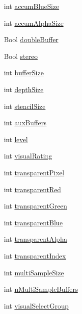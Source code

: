 \begin{DoxyCompactItemize}
\item 
int \hyperlink{struct_____g_l_xvisual_config_rec_a5dd068b5f37bd4b896e9161629acdefd}{accum\+Blue\+Size}
\item 
int \hyperlink{struct_____g_l_xvisual_config_rec_a1f749556f17905b5da92f614983aa5a0}{accum\+Alpha\+Size}
\item 
Bool \hyperlink{struct_____g_l_xvisual_config_rec_a42165fe712f34c8214aa71d5953958be}{double\+Buffer}
\item 
Bool \hyperlink{struct_____g_l_xvisual_config_rec_a5d1f123be522252a20141eb70e79d99e}{stereo}
\item 
int \hyperlink{struct_____g_l_xvisual_config_rec_a4af9a928e1cbb5a2765cae6e5fb545c3}{buffer\+Size}
\item 
int \hyperlink{struct_____g_l_xvisual_config_rec_ab260d7f130a83141e54bc8aa5abc1d9c}{depth\+Size}
\item 
int \hyperlink{struct_____g_l_xvisual_config_rec_a899f4dafc70cb0c9e59ea4461a13a32b}{stencil\+Size}
\item 
int \hyperlink{struct_____g_l_xvisual_config_rec_a7bd75ba88426185827a45f23fe209d67}{aux\+Buffers}
\item 
int \hyperlink{struct_____g_l_xvisual_config_rec_a72475ca5333f2ac05c2d8df045564d8b}{level}
\item 
int \hyperlink{struct_____g_l_xvisual_config_rec_a6ed508db4d8617eabe3308dca055a611}{visual\+Rating}
\item 
int \hyperlink{struct_____g_l_xvisual_config_rec_a67ab90fb429cf9b656a9c9e8039e7d08}{transparent\+Pixel}
\item 
int \hyperlink{struct_____g_l_xvisual_config_rec_a6d9e906e8a1ebf9e06752da26d77cd96}{transparent\+Red}
\item 
int \hyperlink{struct_____g_l_xvisual_config_rec_ab42ad638599dc0aa58a7970402594015}{transparent\+Green}
\item 
int \hyperlink{struct_____g_l_xvisual_config_rec_addf33095e6a7972ec6a936fc5f471589}{transparent\+Blue}
\item 
int \hyperlink{struct_____g_l_xvisual_config_rec_a7baac086759ca2c7118ee228785f6fe3}{transparent\+Alpha}
\item 
int \hyperlink{struct_____g_l_xvisual_config_rec_aa41d7b233b05a3ec2470fff8d3f05ced}{transparent\+Index}
\item 
int \hyperlink{struct_____g_l_xvisual_config_rec_a21b59ad97d2702c3b07693c2c5744519}{multi\+Sample\+Size}
\item 
int \hyperlink{struct_____g_l_xvisual_config_rec_a71bd09a58daf8501adeb900314b9cfd7}{n\+Multi\+Sample\+Buffers}
\item 
int \hyperlink{struct_____g_l_xvisual_config_rec_a49b591cdb5e882ad466d4609c46bd80c}{visual\+Select\+Group}
\end{DoxyCompactItemize}


